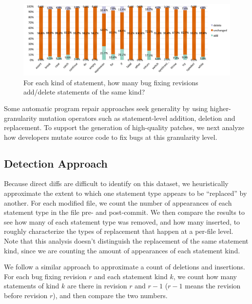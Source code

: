 \documentclass{sig-alternate-05-2015}
\begin{document}
\begin{figure}[!t] \centering \includegraphics[width=\textwidth]{StmtType}
	\vspace{-0.7cm} \caption{For each kind of statement, how many
	bug fixing revisions add/delete statements of the same kind?}
	\label{fig:StmtType} \end{figure}


Some automatic program repair approaches seek generality by using
higher-granularity mutation operators such as statement-level addition, deletion and replacement. To
support the generation of high-quality patches, we 
next analyze how developers mutate source code to fix bugs at this granularity
level. 

\subsection{Detection Approach}
Because direct diffs are difficult to identify on this dataset, we heuristically approximate the
extent to which one statement type appears to be ``replaced'' by another.
For each modified file, we count the number of
appearances of each statement type in the file pre- and post-commit.  We then
compare the results to see how many of each statement type was removed, and how
many inserted, to roughly characterize the types of replacement that happen at a
per-file level.
Note that this analysis doesn't distinguish the
replacement of the same statement kind, since we are counting the amount of
appearances of each statement kind.

We follow a similar approach to approximate a count of deletions and
insertions. 
For each bug fixing revision $r$ and each statement kind $k$, we count how many
statements of kind $k$ are there in revision $r$ and $r-1$ ($r-1$ means the
revision before revision $r$), and then compare the two numbers. 
\end{document}
